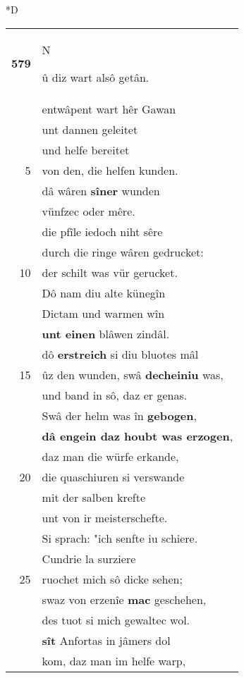 \documentclass[8pt,a4paper,notitlepage]{article}
\begin{document}
\begin{table}[ht]
\begin{minipage}[t]{0.5\linewidth}
\small
\begin{center}*D
\end{center}
\begin{tabular}{rl}
\textbf{579} & \begin{large}N\end{large}û diz wart alsô getân.\\ 
 & entwâpent wart hêr Gawan\\ 
 & unt dannen geleitet\\ 
 & und helfe bereitet\\ 
5 & von den, die helfen kunden.\\ 
 & dâ wâren \textbf{sîner} wunden\\ 
 & vünfzec oder mêre.\\ 
 & die pfîle iedoch niht sêre\\ 
 & durch die ringe wâren gedrucket:\\ 
10 & der schilt was vür gerucket.\\ 
 & Dô nam diu alte künegîn\\ 
 & Dictam und warmen wîn\\ 
 & \textbf{unt einen} blâwen zindâl.\\ 
 & dô \textbf{erstreich} si diu bluotes mâl\\ 
15 & ûz den wunden, swâ \textbf{decheiniu} was,\\ 
 & und band in sô, daz er genas.\\ 
 & Swâ der helm was în \textbf{gebogen},\\ 
 & \textbf{dâ engein daz houbt was erzogen},\\ 
 & daz man die würfe erkande,\\ 
20 & die quaschiuren si verswande\\ 
 & mit der salben krefte\\ 
 & unt von ir meisterschefte.\\ 
 & Si sprach: "ich senfte iu schiere.\\ 
 & Cundrie la surziere\\ 
25 & ruochet mich sô dicke sehen;\\ 
 & swaz von erzenîe \textbf{mac} geschehen,\\ 
 & des tuot si mich gewaltec wol.\\ 
 & \textbf{sît} Anfortas in jâmers dol\\ 
 & kom, daz man im helfe warp,\\ 

\end{tabular}
\end{minipage}
\end{table}
\end{document}
